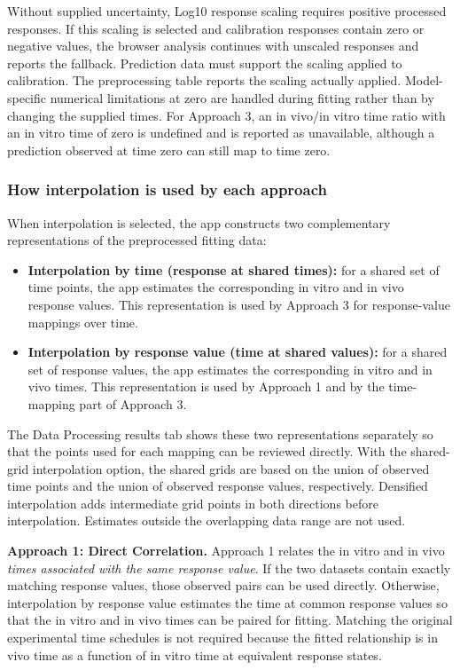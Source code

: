 Without supplied uncertainty, Log10 response scaling requires positive processed responses. If this scaling is selected and calibration responses contain zero or negative values, the browser analysis continues with unscaled responses and reports the fallback. Prediction data must support the scaling applied to calibration. The preprocessing table reports the scaling actually applied. Model-specific numerical limitations at zero are handled during fitting rather than by changing the supplied times. For Approach 3, an in vivo/in vitro time ratio with an in vitro time of zero is undefined and is reported as unavailable, although a prediction observed at time zero can still map to time zero.

\subsubsection{How interpolation is used by each approach}

When interpolation is selected, the app constructs two complementary representations of the preprocessed fitting data:

\begin{itemize}
    \item \textbf{Interpolation by time (response at shared times):} for a shared set of time points, the app estimates the corresponding in vitro and in vivo response values. This representation is used by Approach 3 for response-value mappings over time.
    \item \textbf{Interpolation by response value (time at shared values):} for a shared set of response values, the app estimates the corresponding in vitro and in vivo times. This representation is used by Approach 1 and by the time-mapping part of Approach 3.
\end{itemize}

The Data Processing results tab shows these two representations separately so that the points used for each mapping can be reviewed directly. With the shared-grid interpolation option, the shared grids are based on the union of observed time points and the union of observed response values, respectively. Densified interpolation adds intermediate grid points in both directions before interpolation. Estimates outside the overlapping data range are not used.

\textbf{Approach 1: Direct Correlation.} Approach 1 relates the in vitro and in vivo \emph{times associated with the same response value}. If the two datasets contain exactly matching response values, those observed pairs can be used directly. Otherwise, interpolation by response value estimates the time at common response values so that the in vitro and in vivo times can be paired for fitting. Matching the original experimental time schedules is not required because the fitted relationship is in vivo time as a function of in vitro time at equivalent response states.

